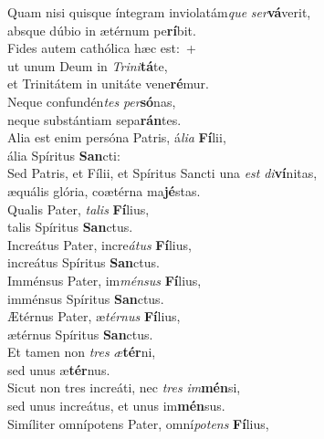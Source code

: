 \evenverse Quam nisi quisque íntegram inviolatám\textit{que} \textit{ser}\textbf{vá}verit,~\*\\
\evenverse absque dúbio in ætérnum pe\textbf{rí}bit.\\
\oddverse Fides autem cathólica hæc est:~+\\
\oddverse  ut unum Deum in \textit{Tri}\textit{ni}\textbf{tá}te,~\*\\
\oddverse et Trinitátem in unitáte vene\textbf{ré}mur.\\
\evenverse Neque confundén\textit{tes} \textit{per}\textbf{só}nas,~\*\\
\evenverse neque substántiam sepa\textbf{rán}tes.\\
\oddverse Alia est enim persóna Patris, á\textit{li}\textit{a} \textbf{Fí}lii,~\*\\
\oddverse ália Spíritus \textbf{San}cti:\\
\evenverse Sed Patris, et Fílii, et Spíritus Sancti una \textit{est} \textit{di}\textbf{ví}nitas,~\*\\
\evenverse æquális glória, coætérna ma\textbf{jé}stas.\\
\oddverse Qualis Pater, \textit{ta}\textit{lis} \textbf{Fí}lius,~\*\\
\oddverse talis Spíritus \textbf{San}ctus.\\
\evenverse Increátus Pater, incre\textit{á}\textit{tus} \textbf{Fí}lius,~\*\\
\evenverse increátus Spíritus \textbf{San}ctus.\\
\oddverse Imménsus Pater, im\textit{mén}\textit{sus} \textbf{Fí}lius,~\*\\
\oddverse imménsus Spíritus \textbf{San}ctus.\\
\evenverse Ætérnus Pater, æ\textit{tér}\textit{nus} \textbf{Fí}lius,~\*\\
\evenverse ætérnus Spíritus \textbf{San}ctus.\\
\oddverse Et tamen non \textit{tres} \textit{æ}\textbf{tér}ni,~\*\\
\oddverse sed unus æ\textbf{tér}nus.\\
\evenverse Sicut non tres increáti, nec \textit{tres} \textit{im}\textbf{mén}si,~\*\\
\evenverse sed unus increátus, et unus im\textbf{mén}sus.\\
\oddverse Simíliter omnípotens Pater, omní\textit{po}\textit{tens} \textbf{Fí}lius,~\*\\
